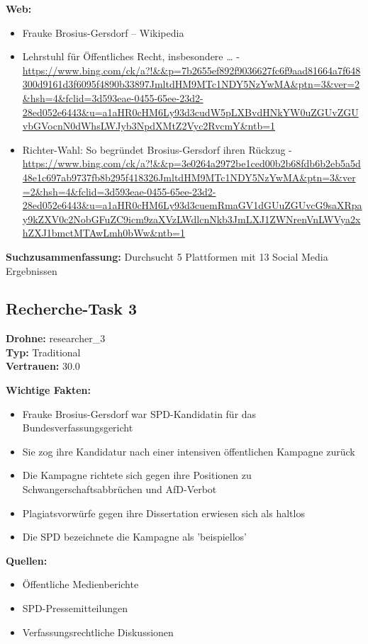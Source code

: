 \documentclass[12pt,a4paper]{article}
\begin{document}
\textbf{Web:}
\begin{itemize}
\item Frauke Brosius-Gersdorf – Wikipedia
\item Lehrstuhl für Öffentliches Recht, insbesondere … - \url{https://www.bing.com/ck/a?!&&p=7b2655ef892f9036627fc6f9aad81664a7f648300d9161d3f6095f4890b33897JmltdHM9MTc1NDY5NzYwMA&ptn=3&ver=2&hsh=4&fclid=3d593eae-0455-65ee-23d2-28ed052e6443&u=a1aHR0cHM6Ly93d3cudW5pLXBvdHNkYW0uZGUvZGUvbGVocnN0dWhsLWJyb3NpdXMtZ2Vyc2RvcmY&ntb=1}
\item Richter-Wahl: So begründet Brosius-Gersdorf ihren Rückzug - \url{https://www.bing.com/ck/a?!&&p=3e0264a2972be1ced00b2b68fdb6b2eb5a5d48e1c697ab9737fb8b295f418326JmltdHM9MTc1NDY5NzYwMA&ptn=3&ver=2&hsh=4&fclid=3d593eae-0455-65ee-23d2-28ed052e6443&u=a1aHR0cHM6Ly93d3cuemRmaGV1dGUuZGUvcG9saXRpay9kZXV0c2NobGFuZC9icm9zaXVzLWdlcnNkb3JmLXJ1ZWNrenVnLWVya2xhZXJ1bmctMTAwLmh0bWw&ntb=1}
\end{itemize}

\textbf{Suchzusammenfassung:} Durchsucht 5 Plattformen mit 13 Social Media Ergebnissen

\subsection{Recherche-Task 3}

\textbf{Drohne:} researcher\_3\\
\textbf{Typ:} Traditional\\
\textbf{Vertrauen:} 30.0%

\textbf{Wichtige Fakten:}
\begin{itemize}
\item Frauke Brosius-Gersdorf war SPD-Kandidatin für das Bundesverfassungsgericht
\item Sie zog ihre Kandidatur nach einer intensiven öffentlichen Kampagne zurück
\item Die Kampagne richtete sich gegen ihre Positionen zu Schwangerschaftsabbrüchen und AfD-Verbot
\item Plagiatsvorwürfe gegen ihre Dissertation erwiesen sich als haltlos
\item Die SPD bezeichnete die Kampagne als 'beispiellos'
\end{itemize}

\textbf{Quellen:}
\begin{itemize}
\item Öffentliche Medienberichte
\item SPD-Pressemitteilungen
\item Verfassungsrechtliche Diskussionen
\end{itemize}
\end{document}
